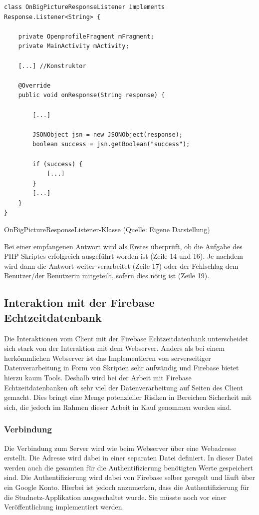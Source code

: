 \documentclass[../main.tex]{subfiles}
\begin{document}
\begin{code}
	\begin{center}
		\begin{verbatim}
class OnBigPictureResponseListener implements Response.Listener<String> {

	private OpenprofileFragment mFragment;
	private MainActivity mActivity;

	[...] //Konstruktor

	@Override
	public void onResponse(String response) {
		
		[...]

		JSONObject jsn = new JSONObject(response);
		boolean success = jsn.getBoolean("success");

		if (success) {
			[...]
		}
		[...]
	}
}
		\end{verbatim}
		\caption{OnBigPictureResponseListener-Klasse (Quelle: Eigene Darstellung)}
		\label{OnResponseListener}
	\end{center}
\end{code}		
	
	Bei einer empfangenen Antwort wird als Erstes überprüft, ob die Aufgabe des PHP-Skriptes erfolgreich ausgeführt worden ist (Zeile 14 und 16). Je nachdem wird dann die Antwort weiter verarbeitet (Zeile 17) oder der Fehlschlag dem Benutzer/der Benutzerin mitgeteilt, sofern dies nötig ist (Zeile 19).
	
	\subsection{Interaktion mit der Firebase Echtzeitdatenbank}
	Die Interaktionen vom Client mit der Firebase Echtzeitdatenbank unterscheidet sich stark von der Interaktion mit dem Webserver. Anders als bei einem herkömmlichen Webserver ist das Implementieren von serverseitiger Datenverarbeitung in Form von Skripten sehr aufwändig und Firebase bietet hierzu kaum Tools. Deshalb wird bei der Arbeit mit Firebase Echtzeitdatenbanken oft sehr viel der Datenverarbeitung auf Seiten des Client gemacht. Dies bringt eine Menge potenzieller Risiken in Bereichen Sicherheit mit sich, die jedoch im Rahmen dieser Arbeit in Kauf genommen worden sind. 
	
	\subsubsection{Verbindung}
	Die Verbindung zum Server wird wie beim Webserver über eine Webadresse erstellt. Die Adresse wird dabei in einer separaten Datei definiert. In dieser Datei werden auch die gesamten für die Authentifizierung benötigten Werte gespeichert sind. Die Authentifizierung wird dabei von Firebase selber geregelt und läuft über ein Google Konto. Hierbei ist jedoch anzumerken, dass die Authentifizierung für die Studnetz-Applikation ausgeschaltet wurde. Sie müsste noch vor einer Veröffentlichung implementiert werden.
	
\end{document}
